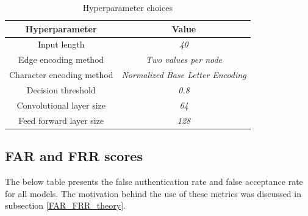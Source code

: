 \begin{center}
	\begin{table}[H]
		
\begin{center}
	\begin{tabular}{ |c|c|} 
		\hline
		Hyperparameter & Value \\
		\hline
		Input length & \textit{40} \\ 
		\hline
		Edge encoding method & \textit{Two values per node} \\		
		\hline 
		Character encoding method & \textit{Normalized Base Letter Encoding} \\		 
		\hline
		Decision threshold & \textit{0.8} \\
		\hline
		Convolutional layer size & \textit{64} \\
		\hline
		Feed forward layer size & \textit{128} \\
		\hline
	\end{tabular}
\end{center}
	\caption{Hyperparameter choices}
	\label{table:hyperparams}
	\end{table}
\end{center}


\subsection{FAR and FRR scores}
The below table presents the false authentication rate and false acceptance rate for all models. The motivation behind the use of these metrics was discussed in subsection \ref{FAR_FRR_theory}.

